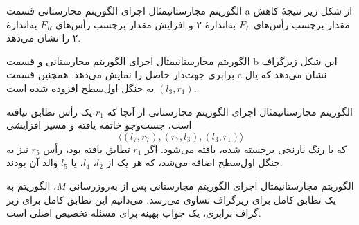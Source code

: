 \begin{itemframe-s}{الگوریتم مجارستانی}{مثال اجرای الگوریتم مجارستانی}
\itm
قسمت a از شکل زیر نتیجهٔ کاهش مقدار برچسب رأس‌های $F_L$ به‌اندازهٔ ۲ و افزایش مقدار برچسب رأس‌های $F_R$ به‌اندازهٔ ۲ را نشان می‌دهد.
\end{itemframe-s}


\begin{itemframe-s}{الگوریتم مجارستانی}{مثال اجرای الگوریتم مجارستانی}
\itm
و قسمت b این شکل زیرگراف برابری جهت‌دار حاصل را نمایش می‌دهد.
 همچنین قسمت c نشان می‌دهد که یال
$(l_3, r_1)$
به جنگل اول‌سطح افزوده شده است.
\end{itemframe-s}


\begin{itemframe-s}{الگوریتم مجارستانی}{مثال اجرای الگوریتم مجارستانی}
\itm
از آنجا که
$r_1$
یک رأس تطابق نیافته است، جست‌وجو خاتمه یافته و مسیر افزایشی
$$
\langle (l_7, r_7), (r_7, l_3), (l_3, r_1) \rangle
$$
که با رنگ نارنجی برجسته شده، یافته می‌شود. اگر
$r_1$
تطابق یافته بود، رأس
$r_5$
نیز به جنگل اول‌سطح اضافه می‌شد، که هر یک از
$l_2$،
$l_4$، یا
$l_5$
والد آن بودند.

\end{itemframe-s}


\begin{itemframe-s}{الگوریتم مجارستانی}{مثال اجرای الگوریتم مجارستانی}
\itm
پس از به‌روزرسانی $M$، الگوریتم به یک تطابق کامل برای زیرگراف تساوی می‌رسد. می‌دانیم این تطابق کامل برای زیر گراف برابری، یک جواب بهینه برای مسئله تخصیص اصلی است.
\end{itemframe-s}